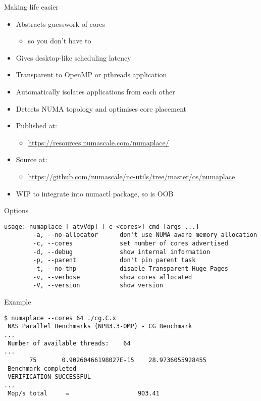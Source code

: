 \documentclass{beamer}
\begin{document}
\begin{frame}[fragile]{Making life easier}
\begin{itemize}
\item Abstracts guesswork of cores
	\begin{itemize}
	\item so you don't have to
	\end{itemize}

\vspace{4pt}
\item Gives desktop-like scheduling latency
\vspace{4pt}
\item Transparent to OpenMP or pthreads application
\vspace{4pt}
\item Automatically isolates applications from each other
\vspace{4pt}
\item Detects NUMA topology and optimises core placement
\item Published at:
	\begin{itemize}
	\item \url{https://resources.numascale.com/numaplace/}
	\end{itemize}
\item Source at:
	\begin{itemize}
	\item \url{https://github.com/numascale/nc-utils/tree/master/os/numaplace}
	\end{itemize}

\item WIP to integrate into numactl package, so is OOB
\end{itemize}
\end{frame}

\begin{frame}[fragile]{Options}
\begin{verbatim}
usage: numaplace [-atvVdp] [-c <cores>] cmd [args ...]
        -a, --no-allocator      don't use NUMA aware memory allocation
        -c, --cores             set number of cores advertised
        -d, --debug             show internal information
        -p, --parent            don't pin parent task
        -t, --no-thp            disable Transparent Huge Pages
        -v, --verbose           show cores allocated
        -V, --version           show version
\end{verbatim}
\end{frame}

\begin{frame}[fragile]{Example}
\begin{verbatim}
$ numaplace --cores 64 ./cg.C.x
 NAS Parallel Benchmarks (NPB3.3-OMP) - CG Benchmark
...
 Number of available threads:    64
...
       75       0.90260466198027E-15    28.9736055928455
 Benchmark completed
 VERIFICATION SUCCESSFUL
...
 Mop/s total     =                   903.41
\end{verbatim}
\end{frame}
\end{document}

